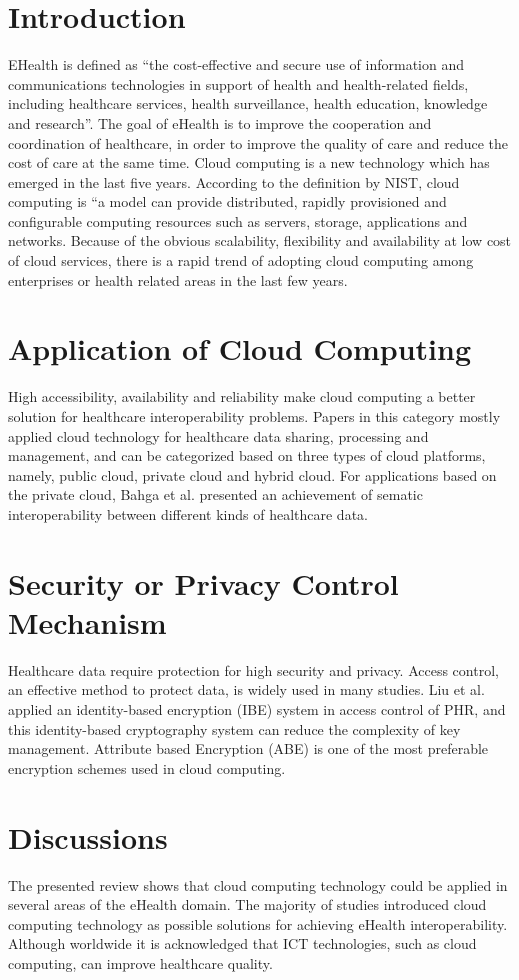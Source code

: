 \documentclass[10pt,a4paper]{article}
\begin{document}
\section{Introduction}
EHealth is defined as “the cost-effective and secure use of information and communications
technologies in support of health and health-related fields, including healthcare services, health surveillance, health education, knowledge and research”. The goal of eHealth is to improve the cooperation and coordination of healthcare, in order to improve the quality of care and reduce the cost of care at the same time.
Cloud computing is a new technology which has emerged in the last five years. \cite{T1} According to the definition by NIST, cloud computing is “a model can provide distributed, rapidly provisioned and configurable computing resources such as servers, storage, applications and networks. Because of the obvious scalability, flexibility and availability at low cost of cloud services, there is a rapid trend of adopting cloud computing among enterprises or health related areas in the last few years.

\section{Application of Cloud Computing} 
\cite{T2} High accessibility, availability and reliability make cloud computing a better solution for healthcare interoperability problems. Papers in this category mostly applied cloud technology for healthcare data sharing, processing and management, and can be categorized based on three types of cloud platforms, namely, public cloud, private cloud and hybrid cloud. For applications based on the private cloud, Bahga et al. presented an achievement of sematic interoperability between different kinds of healthcare data.

\section{Security or Privacy Control Mechanism}
Healthcare data require protection for high security and privacy. Access control, an effective
method to protect data, is widely used in many studies.\cite{T3} Liu et al. applied an identity-based encryption (IBE) system in access control of PHR, and this identity-based cryptography system can reduce the complexity of key management. Attribute based Encryption (ABE) is one of the most preferable encryption schemes used in cloud computing.

\section{Discussions}
The presented review shows that cloud computing technology could be applied in several areas of the eHealth domain.
The majority of studies introduced cloud computing technology as possible solutions for achieving eHealth interoperability. Although worldwide it is acknowledged that ICT technologies, such as cloud computing, can improve healthcare quality.
\end{document}
